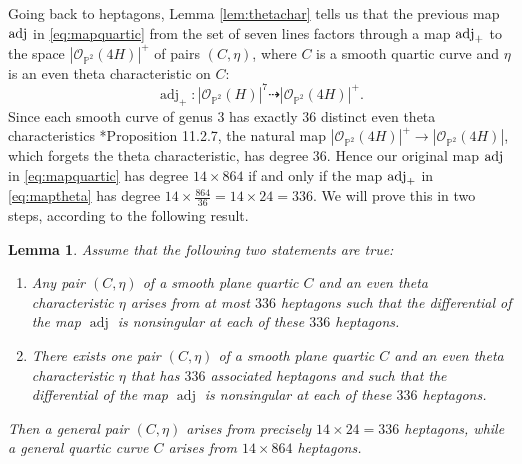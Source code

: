 \documentclass[12pt]{article}
\newtheorem{lemma}[theorem]{Lemma}
\numberwithin{equation}{section}
\theoremstyle{definition}
\DeclareMathOperator{\adj}{adj}
\begin{document}
Going back to heptagons, Lemma \ref{lem:thetachar} tells us that the previous map ${\rm adj}$ in \eqref{eq:mapquartic} from the set of seven lines factors through a map ${\rm adj}_+$ to the space $|\mathcal{O}_{\mathbb{P}^2}(4H)|^{+}$ of pairs $(C,\eta)$, where $C$ is a smooth quartic curve and $\eta$ is an even theta characteristic on $C$:
\begin{equation}\label{eq:maptheta} 
\adj_+\colon |\mathcal{O}_{\mathbb{P}^2}(H)|^{7} \dashrightarrow |\mathcal{O}_{\mathbb{P}^2}(4H)|^{+}.
\end{equation}
Since each smooth curve of genus $3$ has exactly $36$ distinct even theta characteristics \cite{BLAbvar}*{Proposition 11.2.7}, the natural map $|\mathcal{O}_{\mathbb{P}^2}(4H)|^{+} \to |\mathcal{O}_{\mathbb{P}^2}(4H)|$, which forgets the theta characteristic, has degree $36$. Hence our original map ${\rm adj}$ in \eqref{eq:mapquartic} has degree $14\times 864$ if and only if the map ${\rm adj}_+$ in \eqref{eq:maptheta} has degree $14\times \frac{864}{36} = 14 \times 24 = 336$. We will prove this in two steps, according to the following result.
\begin{lemma}\label{lemma:twoconditions}
	Assume that the following two statements are true:
	\begin{enumerate}
	  \item[$(*)$] Any pair $(C,\eta)$ of a smooth plane quartic $C$ and an even theta characteristic $\eta$ arises from at most $336$ heptagons such that the differential of the map $\operatorname{adj}$ is nonsingular at each of these $336$ heptagons.
	  \item[$(**)$] There exists one pair $(C,\eta)$ of a smooth plane quartic $C$ and an even theta characteristic $\eta$ that has $336$ associated heptagons and such that the differential of the map $\operatorname{adj}$ is nonsingular at each of these $336$ heptagons.
	\end{enumerate}
    Then a general pair $(C,\eta)$ arises from precisely $14\times 24=336$ heptagons, while a general quartic curve $C$ arises from $14\times 864$ heptagons.  
\end{lemma}
\end{document}
